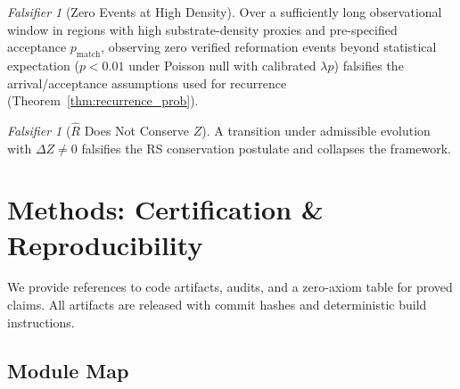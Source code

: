 \documentclass[11pt,letterpaper]{article}
\theoremstyle{definition}
\theoremstyle{remark}
\newtheorem{falsifier}[theorem]{Falsifier}
\begin{document}
\begin{falsifier}[Zero Events at High Density]
Over a sufficiently long observational window in regions with high substrate-density proxies and pre-specified acceptance \(p_{\mathrm{match}}\), observing zero verified reformation events beyond statistical expectation (\(p<0.01\) under Poisson null with calibrated \(\lambda p\)) falsifies the arrival/acceptance assumptions used for recurrence (Theorem~\ref{thm:recurrence_prob}).
\end{falsifier}

\begin{falsifier}[\texorpdfstring{\(\widehat{R}\)}{R̂} Does Not Conserve \texorpdfstring{\(Z\)}{Z}]
A transition under admissible evolution with \(\Delta Z\ne 0\) falsifies the RS conservation postulate and collapses the framework.
\end{falsifier}

\section{Methods: Certification \& Reproducibility}

We provide references to code artifacts, audits, and a zero-axiom table for proved claims. All artifacts are released with commit hashes and deterministic build instructions.

\subsection{Module Map}
\end{document}
